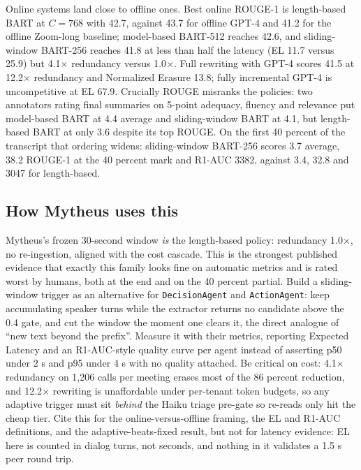 Online systems land close to offline ones. Best online ROUGE-1 is length-based BART at $C{=}768$ with 42.7, against 43.7 for offline GPT-4 and 41.2 for the offline Zoom-long baseline; model-based BART-512 reaches 42.6, and sliding-window BART-256 reaches 41.8 at less than half the latency (EL 11.7 versus 25.9) but 4.1$\times$ redundancy versus 1.0$\times$. Full rewriting with GPT-4 scores 41.5 at 12.2$\times$ redundancy and Normalized Erasure 13.8; fully incremental GPT-4 is uncompetitive at EL 67.9. Crucially ROUGE misranks the policies: two annotators rating final summaries on 5-point adequacy, fluency and relevance put model-based BART at 4.4 average and sliding-window BART at 4.1, but length-based BART at only 3.6 despite its top ROUGE. On the first 40 percent of the transcript that ordering widens: sliding-window BART-256 scores 3.7 average, 38.2 ROUGE-1 at the 40 percent mark and R1-AUC 3382, against 3.4, 32.8 and 3047 for length-based.

\subsection{How Mytheus uses this}
\begin{takeaway}
Mytheus's frozen 30-second window \emph{is} the length-based policy: redundancy 1.0$\times$, no re-ingestion, aligned with the cost cascade. This is the strongest published evidence that exactly this family looks fine on automatic metrics and is rated worst by humans, both at the end and on the 40 percent partial. Build a sliding-window trigger as an alternative for \texttt{DecisionAgent} and \texttt{ActionAgent}: keep accumulating speaker turns while the extractor returns no candidate above the 0.4 gate, and cut the window the moment one clears it, the direct analogue of ``new text beyond the prefix''. Measure it with their metrics, reporting Expected Latency and an R1-AUC-style quality curve per agent instead of asserting p50 under 2 s and p95 under 4 s with no quality attached. Be critical on cost: 4.1$\times$ redundancy on 1,206 calls per meeting erases most of the 86 percent reduction, and 12.2$\times$ rewriting is unaffordable under per-tenant token budgets, so any adaptive trigger must sit \emph{behind} the Haiku triage pre-gate so re-reads only hit the cheap tier. Cite this for the online-versus-offline framing, the EL and R1-AUC definitions, and the adaptive-beats-fixed result, but not for latency evidence: EL here is counted in dialog turns, not seconds, and nothing in it validates a 1.5 s peer round trip.
\end{takeaway}


